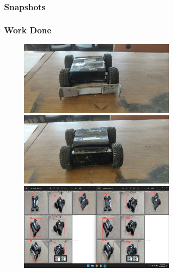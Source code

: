 \renewcommand\bibname{References} %





\newpage

\subsubsection{Snapshots}
\subsubsection{Work Done}
\begin{figure}[!th] %
	\includegraphics[width = 3in]{images/botpic10.jpg} 
	\hspace{.5cm}
	\includegraphics[width = 3in]{images/botpic11.jpg} 
	\label{figSample1} %
	\includegraphics[width = 3in]{images/botlap.png} 
	\label{figSample1} %
\end{figure}


